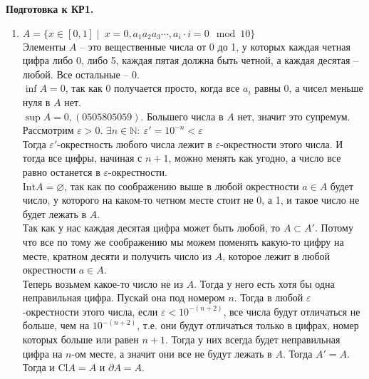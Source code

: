 \documentclass[a4paper]{article}
\def\eps{\varepsilon}
\def\Int{\mathrm{Int}}
\def\Cl{\mathrm{Cl}}
\begin{document}
\newcommand\HeaderDZ[1]{
\begin{center}
		\textbf{Подготовка к КР#1.}
\end{center}
\vspace{-\baselineskip}
\bigskip
\bigskip
}



\renewcommand{\labelenumii}{\arabic{enumii})}
\renewcommand{\labelenumiii}{\roman{enumiii})}

\HeaderDZ{1}

\begin{enumerate}
    \item $A = \{x \in [0, 1]\mid\ x = 0,a_1a_2a_3\cdots, a_i\cdot i = 0 \mod 10\}$\\
    Элементы $A$ -- это вещественные числа от 0 до 1, у которых каждая четная цифра либо 0, либо 5, каждая пятая должна быть четной, а каждая десятая -- любой. Все остальные -- 0.\\
    $\inf A = 0$, так как 0 получается просто, когда все $a_i$ равны 0, а чисел меньше нуля в $A$ нет.\\
    $\sup A = 0,(0505805059)$. Большего числа в $A$ нет, значит это супремум.\\
    Рассмотрим $\eps > 0$. $\exists n\in \mathbb {N} :\ \eps' = 10^{-n} < \eps$\\
    Тогда $\eps'$-окрестность любого числа лежит в $\eps$-окрестности этого числа. И тогда все цифры, начиная с $n+1$, можно менять как угодно, а число все равно останется в $\eps$-окрестности.\\
    $\Int A = \varnothing$, так как по соображению выше в любой окрестности $a \in A$ будет число, у которого на каком-то четном месте стоит не 0, а 1, и такое число не будет лежать в $A$.\\
    Так как у нас каждая десятая цифра может быть любой, то $A \subset A'$. Потому что все по тому же соображению мы можем поменять какую-то цифру на месте, кратном десяти и получить число из $A$, которое лежит в любой окрестности $a \in A$.\\
    Теперь возьмем какое-то число не из $A$. Тогда у него есть хотя бы одна неправильная цифра. Пускай она под номером $n$. Тогда в любой $\eps$-окрестности этого числа, если $\eps < 10^{-(n+2)}$, все числа будут отличаться не больше, чем на $10^{-(n+2)}$, т.е. они будут отличаться только в цифрах, номер которых больше или равен $n+1$. Тогда у них всегда будет неправильная цифра на $n$-ом месте, а значит они все не будут лежать в $A$. Тогда $A' = A$.\\
    Тогда и $\Cl A = A$ и $\partial A = A$.


\end{enumerate}
\end{document}
